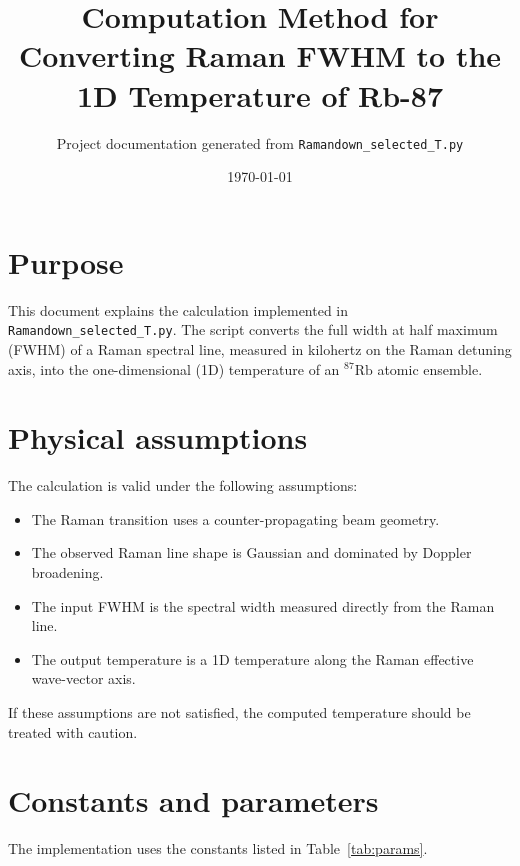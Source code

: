 \documentclass[11pt]{article}
\title{Computation Method for Converting Raman FWHM to the 1D Temperature of Rb-87}
\author{Project documentation generated from \texttt{Ramandown\_selected\_T.py}}
\date{\today}
\begin{document}
\maketitle

\section{Purpose}
This document explains the calculation implemented in \texttt{Ramandown\_selected\_T.py}. The script converts the full width at half maximum (FWHM) of a Raman spectral line, measured in kilohertz on the Raman detuning axis, into the one-dimensional (1D) temperature of an $^{87}\mathrm{Rb}$ atomic ensemble.

\section{Physical assumptions}
The calculation is valid under the following assumptions:
\begin{itemize}
    \item The Raman transition uses a counter-propagating beam geometry.
    \item The observed Raman line shape is Gaussian and dominated by Doppler broadening.
    \item The input FWHM is the spectral width measured directly from the Raman line.
    \item The output temperature is a 1D temperature along the Raman effective wave-vector axis.
\end{itemize}
If these assumptions are not satisfied, the computed temperature should be treated with caution.

\section{Constants and parameters}
The implementation uses the constants listed in Table~\ref{tab:params}.
\end{document}
